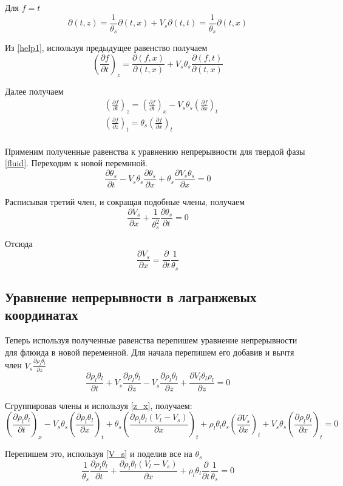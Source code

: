 \documentclass[12pt,a4paper]{article}
\newcommand{\pd}[2]{\frac{\partial #1}{\partial #2}}
\begin{document}
Для $ f = t $ 
$$
\partial(t , z) = \frac{1}{\theta_s} \partial(t , x) + V_s \partial(t , t) = \frac{1}{\theta_s} \partial(t , x)
$$

Из \eqref{help1}, используя предыдущее равенство получаем
$$
\left(\pd{f}{t}\right)_z = \pd{(f , x)}{(t , x)} + V_s \theta_s\pd{(f ,t)}{(t , x)}
$$

Далее получаем
\begin{equation}
\begin{aligned}
&\left(\pd{f}{t}\right)_z = \left(\pd{f}{t}\right)_x - V_s\theta_s\left(\pd{f}{x}\right)_t\\
&\left(\pd{f}{z}\right)_t = \theta_s\left(\pd{f}{x}\right)_t\\
\end{aligned}
\label{z_x}
\end{equation}

Применим полученные равенства к уравнению непрерывности для твердой фазы \eqref{fluid}. Переходим к новой перемнной.
$$
\pd{\theta_s}{t} - V_s\theta_s\pd{\theta_s}{x} + \theta_s\pd{V_s\theta_s}{x} =0
$$

Расписывая третий член, и сокращая подобные члены, получаем
$$
\pd{V_s}{x} + \frac{1}{\theta_s^2}\pd{\theta_s}{t} = 0
$$

Отсюда
\begin{equation}
\pd{V_s}{x} = \pd{}{t}\frac{1}{\theta_s}
\label{V_s}
\end{equation}

\subsection{Уравнение непрерывности в лагранжевых координатах}
Теперь используя полученные равенства перепишем уравнение непрерывности для флюида в новой переменной. Для начала перепишем его добавив и вычтя член $V_s\pd{\rho_l\theta_l}{z} $
$$
\pd{\rho_l\theta_l}{t} + V_s\pd{\rho_l\theta_l}{z} - V_s\pd{\rho_l\theta_l}{z} + \pd{V_l\theta_l\rho_l}{z} =0
$$

Сгруппировав члены и используя \eqref{z_x}, получаем:
$$
\left(\pd{\rho_l\theta_l}{t}\right)_x - V_s\theta_s \left(\pd{\rho_l\theta_l}{x}\right)_t + \theta_s\left(\pd{\rho_l\theta_l(V_l - V_s)}{x}\right)_t + \rho_l\theta_l\theta_s\left(\pd{V_s}{x}\right)_t + V_s\theta_s \left(\pd{\rho_l\theta_l}{x}\right)_t = 0
$$

Перепишем это, используя \eqref{V_s} и поделив все на $\theta_s$
$$
\frac{1}{\theta_s}\pd{\rho_l\theta_l}{t} + \pd{\rho_l\theta_l(V_l-V_s)}{x} + \rho_l\theta_l\pd{}{t}\frac{1}{\theta_s} = 0
$$
\end{document}
